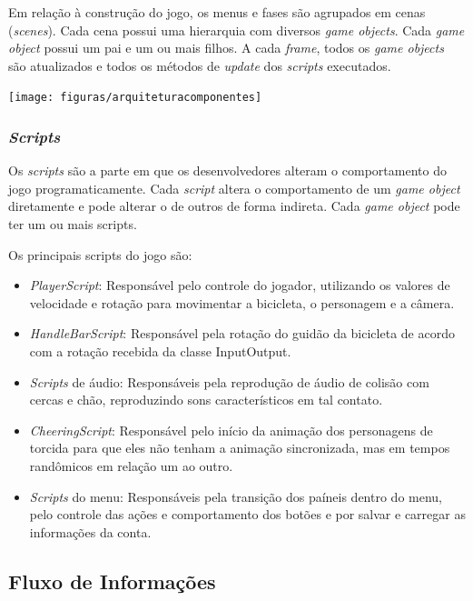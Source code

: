 Em relação à construção do jogo, os menus e fases são agrupados em cenas (\textit{scenes}). Cada cena possui uma hierarquia com diversos \textit{game objects}. Cada \textit{game object} possui um pai e um ou mais filhos. A cada \textit{frame}, todos os \textit{game objects} são atualizados e todos os métodos de \textit{update} dos \textit{scripts} executados.

\begin{center}
	\texttt{[image: figuras/arquiteturacomponentes]}
	\label{figura:arquiteturacomponentes}
\end{center}

\subsubsection{\textit{Scripts}}

Os \textit{scripts} são a parte em que os desenvolvedores alteram o comportamento do jogo programaticamente. Cada \textit{script} altera o comportamento de um \textit{game object} diretamente e pode alterar o de outros de forma indireta. Cada \textit{game object} pode ter um ou mais scripts.

Os principais scripts do jogo são:

\begin{itemize}
\item \textit{PlayerScript}: Responsável pelo controle do jogador, utilizando os valores de velocidade e rotação para movimentar a bicicleta, o personagem e a câmera.
\item \textit{HandleBarScript}: Responsável pela rotação do guidão da bicicleta de acordo com a rotação recebida da classe InputOutput.
\item \textit{Scripts} de áudio: Responsáveis pela reprodução de áudio de colisão com cercas e chão, reproduzindo sons característicos em tal contato.
\item \textit{CheeringScript}: Responsável pelo início da animação dos personagens de torcida para que eles não tenham a animação sincronizada, mas em tempos randômicos em relação um ao outro.
\item \textit{Scripts} do menu: Responsáveis pela transição dos paíneis dentro do menu, pelo controle das ações e comportamento dos botões e por salvar e carregar as informações da conta.
\end{itemize}

\subsection{Fluxo de Informa\c{c}ões}
